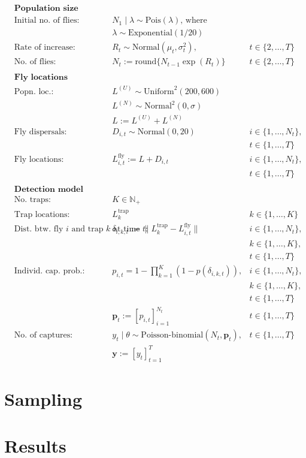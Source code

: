 \documentclass[
]{book}
\begin{document}
\[
\begin{aligned}
&\textbf{Population size} \\
&\text{Initial no. of flies:} && N_1 \mid \lambda \sim \mathrm{Pois}(\lambda) \text{, where} \\
&&& \lambda \sim \mathrm{Exponential}(1/20) \\
& \text{Rate of increase:}~ && R_t \sim \mathrm{Normal}(\mu_t, \sigma^2_t), & t \in \{2, \ldots, T \} \\
& \text{No. of flies:}~ && N_t := \mathrm{round} \{ N_{t-1} \exp(R_t) \}    & t \in \{2, \ldots, T\} \\
\\
&\textbf{Fly locations} \\
& \text{Popn. loc.:}~ && L^{(U)} \sim \mathrm{Uniform}^2(200, 600) \\
&&& L^{(N)} \sim \mathrm{Normal}^2(0, \sigma) \\
&&& L := L^{(U)} + L^{(N)} \\
& \text{Fly dispersals:}~ && D_{i,t} \sim \mathrm{Normal}(0, 20) & i \in \{1, \ldots, N_t\}, \\
  &&&& t \in \{1, \ldots, T\}\\
& \text{Fly locations:}~ && L_{i,t}^\text{fly} := L + D_{i,t} & i \in \{1, \ldots, N_t\}, \\
  &&&& t \in \{1, \ldots, T\}\\
\\
&\textbf{Detection model} \\
& \text{No. traps:}~ && K \in \mathbb N_+ \\
& \text{Trap locations:}~ && L_k^\text{trap} & k \in \{1, \ldots, K\} \\
& \text{Dist. btw. fly } i \text{ and trap } k \text{ at time } t \text{:} && \delta_{i,k,t} := \lVert L_k^\text{trap} - L_{i,t}^\text{fly} \rVert & i \in \{1, \ldots, N_t\}, \\
  &&&& k \in \{1, \ldots, K\}, \\
  &&&& t \in \{1, \ldots, T\}\\
& \text{Individ. cap. prob.:} && p_{i, t} = 1 - \prod_{k=1}^K (1 - p(\delta_{i,k,t})), & i \in \{1, \ldots, N_t\}, \\
  &&&& k \in \{1, \ldots, K\}, \\
  &&&& t \in \{1, \ldots, T\}\\
&  && \mathbf p_t := [p_{i,t}]_{i=1}^{N_t}  & t \in \{1, \ldots, T\} \\
&\text{No. of captures:}~ && y_t \mid \theta \sim \text{Poisson-binomial}(N_t, \mathbf p_t), & t \in \{1, \ldots, T\} \\
  &&& \mathbf y := [y_t]_{t=1}^T
\end{aligned}
\]

\hypertarget{sampling}{%
\section{Sampling}\label{sampling}}

\hypertarget{results}{%
\section{Results}\label{results}}

\renewcommand{\baselinestretch}{1}\normalsize

  
\end{document}
